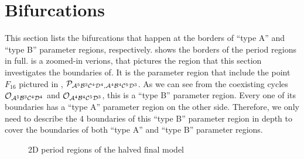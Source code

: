 \section{Bifurcations}

This section lists the bifurcations that happen at the borders of ``type A'' and ``type B'' parameter regions, respectively.
 shows the borders of the period regions in full.
 is a zoomed-in verions, that pictures the region that this section investigates the boundaries of.
It is the parameter region that include the point $F_{16}$ pictured in , $\mathcal{P}_{\mathcal{A}^5\mathcal{B}^3\mathcal{C}^4\mathcal{D}^4, \mathcal{A}^4\mathcal{B}^4\mathcal{C}^5\mathcal{D}^3}$.
As we can see from the coexisting cycles $\mathcal{O}_{\mathcal{A}^5\mathcal{B}^3\mathcal{C}^4\mathcal{D}^4}$ and $\mathcal{O}_{\mathcal{A}^4\mathcal{B}^4\mathcal{C}^5\mathcal{D}^3}$, this is a ``type B'' parameter region.
Every one of its boundaries has a ``type A'' parameter region on the other side.
Therefore, we only need to describe the 4 boundaries of this ``type B'' parameter region in depth to cover the boundaries of both ``type A'' and ``type B'' parameter regions.

\begin{figure}
    \centering
    \caption{2D period regions of the halved final model}
\end{figure}



